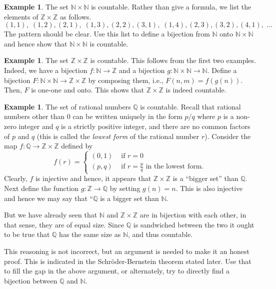 \documentclass[preprint,  11pt]{amsart}
\theoremstyle{plain} %
\theoremstyle{definition} %
\newtheorem{example}[theorem]{Example}
\begin{document}
\begin{example} The set $\mathbb{N}\times \mathbb{N}$ is countable. Rather than give a formula, we list the elements of $\mathbb{Z}\times \mathbb{Z}$ as follows.
$$
(1,1), \; (1,2), (2,1), \; (1,3), (2,2), (3,1), \; (1,4),(2,3),(3,2),(4,1),  \; \ldots 
$$
The pattern should be clear. Use this list to define a bijection from $\mathbb{N}$ onto $\mathbb{N}\times \mathbb{N}$ and hence show that $\mathbb{N}\times \mathbb{N}$ is countable.
\end{example}

\begin{example} The set $\mathbb{Z}\times \mathbb{Z}$ is countable. This follows from the first two examples. Indeed, we have a bijection $f:\mathbb{N}\rightarrow \mathbb{Z}$ and a bijection $g:\mathbb{N}\times \mathbb{N} \rightarrow \mathbb{N}$. Define a bijection $F:\mathbb{N}\times \mathbb{N}\rightarrow \mathbb{Z}\times \mathbb{Z}$ by composing them, i.e., $F(n,m)=f(g(n))$. Then, $F$ is one-one and onto. This shows that $\mathbb{Z}\times \mathbb{Z}$ is indeed countable.
\end{example}

\begin{example} The set of rational numbers $\mathbb{Q}$ is countable. Recall that rational numbers other than $0$ can be written uniquely in the form $p/q$ where $p$ is a non-zero integer and $q$ is a strictly positive integer, and there are no common factors of $p$ and $q$ (this is called the {\em lowest form} of the rational number $r$). Consider the map $f:\mathbb{Q}\rightarrow \mathbb{Z}\times \mathbb{Z}$ defined by
$$
f(r) = \begin{cases} (0,1) & \mbox{ if }r=0 \\ (p,q) & \mbox{ if }r=\frac{p}{q} \mbox{ in the lowest form}. \end{cases}
$$
Clearly, $f$ is injective and hence, it appears that $\mathbb{Z}\times \mathbb{Z}$ is a ``bigger set'' than $\mathbb{Q}$. Next define the function $g:\mathbb{Z}\rightarrow \mathbb{Q}$ by setting $g(n)=n$. This is also injective and hence we may say that ``$\mathbb{Q}$ is a bigger set than $\mathbb{N}$. 

But we  have already seen that $\mathbb{N}$ and $\mathbb{Z}\times \mathbb{Z}$ are in bijection with each other, in that sense, they are of equal size. Since $\mathbb{Q}$ is sandwiched between the two it ought to be true that $\mathbb{Q}$ has the same size as $\mathbb{N}$, and thus countable.

This reasoning is not incorrect, but an argument is needed to make it an honest proof. This is indicated in the Schr\"{o}der-Bernstein theorem stated later. Use that to fill the gap in the above argument, or alternately, try to directly find a bijection between $\mathbb{Q}$ and $\mathbb{N}$.
\end{example}
\end{document}
